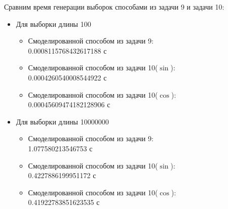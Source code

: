 \documentclass{article}
\begin{document}
Сравним время генерации выборок способами из задачи 9 и задачи 10:
\begin{itemize}
	\item Для выборки длины 100
	\begin{itemize}
		\item Смоделированной способом из задачи 9: \\0.0008115768432617188 с
		\item Смоделированной способом из задачи 10($\sin$): \\0.0004260540008544922 с
		\item Смоделированной способом из задачи 10($\cos$): \\0.00045609474182128906 с
	\end{itemize}
	\item Для выборки длины 10000000
	\begin{itemize}
		\item Смоделированной способом из задачи 9: \\1.077580213546753 с
		\item Смоделированной способом из задачи 10($\sin$): \\0.4227886199951172 с
		\item Смоделированной способом из задачи 10($\cos$): \\0.41922783851623535 с
	\end{itemize}
\end{itemize}
\end{document}
